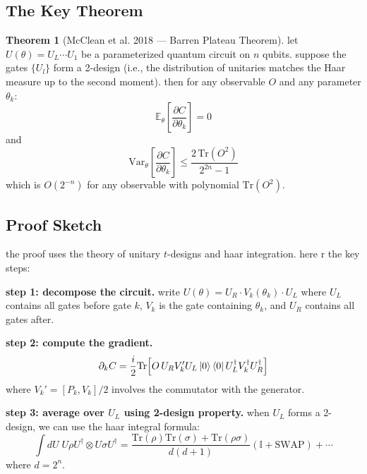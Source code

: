 \documentclass[11pt,a4paper]{article}
\theoremstyle{definition}
\newtheorem{theorem}{Theorem}[section]
\theoremstyle{remark}
\begin{document}
\subsection{The Key Theorem}

\begin{theorem}[McClean et al. 2018 --- Barren Plateau Theorem]
let $U(\theta) = U_L \cdots U_1$ be a parameterized quantum circuit on $n$ qubits. suppose the gates $\{U_l\}$ form a 2-design (i.e., the distribution of unitaries matches the Haar measure up to the second moment). then for any observable $O$ and any parameter $\theta_k$:
\begin{equation}
    \mathbb{E}_\theta\left[\frac{\partial C}{\partial \theta_k}\right] = 0
\end{equation}
and
\begin{equation}
    \text{Var}_\theta\left[\frac{\partial C}{\partial \theta_k}\right] \leq \frac{2 \, \text{Tr}(O^2)}{2^{2n} - 1}
\end{equation}
which is $O(2^{-n})$ for any observable with polynomial $\text{Tr}(O^2)$.
\end{theorem}

\subsection{Proof Sketch}

the proof uses the theory of unitary $t$-designs and haar integration. here r the key steps:

\textbf{step 1: decompose the circuit.} write $U(\theta) = U_R \cdot V_k(\theta_k) \cdot U_L$ where $U_L$ contains all gates before gate $k$, $V_k$ is the gate containing $\theta_k$, and $U_R$ contains all gates after.

\textbf{step 2: compute the gradient.}
\begin{equation}
    \partial_k C = \frac{i}{2} \text{Tr}\Big[O \, U_R V_k' U_L \ket{0}\bra{0} U_L^\dagger V_k^\dagger U_R^\dagger\Big]
\end{equation}
where $V_k' = [P_k, V_k]/2$ involves the commutator with the generator.

\textbf{step 3: average over $U_L$ using 2-design property.} when $U_L$ forms a 2-design, we can use the haar integral formula:
\begin{equation}
    \int dU \; U \rho U^\dagger \otimes U \sigma U^\dagger = \frac{\text{Tr}(\rho)\text{Tr}(\sigma) + \text{Tr}(\rho\sigma)}{d(d+1)} (\mathbb{I} + \text{SWAP}) + \cdots
\end{equation}
where $d = 2^n$.
\end{document}
